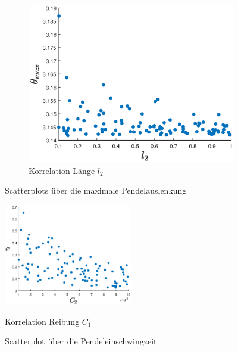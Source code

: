 \begin{figure}
    \begin{subfigure}[]{0.3\textwidth}
        \centering
        \includegraphics[width=\textwidth]{Bilder/5_sensi/cm/theta_max_l2.eps}
        \caption{Korrelation Länge $l_2$}
        \label{fig:scatter_theta_max_l2}
    \end{subfigure}
    \caption{Scatterplots über die maximale Pendelauslenkung}
\end{figure}

\begin{figure}
    \centering
        \centering
        \includegraphics[width=0.5\textwidth]{Bilder/5_sensi/cm/theta_max_c1.eps}
        \caption{Korrelation Reibung $C_1$}
        \label{fig:scatter_theta_t_c1}
    \caption{Scatterplot über die Pendeleinschwingzeit}
\end{figure}

